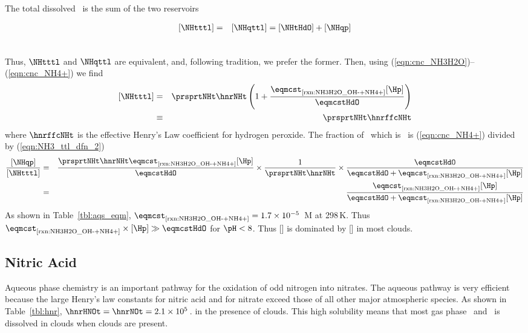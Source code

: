 \documentclass[12pt,twoside]{book}
\begin{document}
The total dissolved \NHt\ is the sum of the two reservoirs    
\newline\parbox{6in}{ %
\begin{eqnarray*}
[\NHtttl] & = & [\NHqttl] = [\NHtHdO] + [\NHqp]
\end{eqnarray*}
}\hfill %
\parbox{1cm}{\begin{eqnarray}\label{eqn:NH3_ttl_dfn}\end{eqnarray}}\newline
Thus, $\NHtttl$ and $\NHqttl$ are equivalent, and, following
tradition, we prefer the former.
Then, using (\ref{eqn:cnc_NH3H2O})--(\ref{eqn:cnc_NH4+}) we find
\begin{eqnarray}
\label{eqn:NH3_ttl_dfn_2}
[\NHtttl] & = & \prsprtNHt \hnrNHt \left(
1 + \frac{\eqmcst_{\mbox{\scriptsize \ref{rxn:NH3H2O_OH-+NH4+}}} [\Hp]}{\eqmcstHdO }
\right)
\\ %
\label{eqn:hnr_ffc_NH3_dfn}
& \equiv & \prsprtNHt \hnrffcNHt
\end{eqnarray}
where $\hnrffcNHt$ is the effective Henry's Law coefficient for
hydrogen peroxide.
The fraction of \NHtttl\ which is \NHqp\ is (\ref{eqn:cnc_NH4+}) divided
by (\ref{eqn:NH3_ttl_dfn_2})
\begin{eqnarray}
\frac{[\NHqp]}{[\NHtttl] } & = & 
\frac{\prsprtNHt \hnrNHt \eqmcst_{\mbox{\scriptsize \ref{rxn:NH3H2O_OH-+NH4+}}} [\Hp] }{
\eqmcstHdO } 
\times
\frac{1}{\prsprtNHt \hnrNHt } \times
\frac{\eqmcstHdO}{\eqmcstHdO + \eqmcst_{\mbox{\scriptsize \ref{rxn:NH3H2O_OH-+NH4+}}} [\Hp] }
\nonumber \\
& = & 
\frac{\eqmcst_{\mbox{\scriptsize \ref{rxn:NH3H2O_OH-+NH4+}}} [\Hp] }{
\eqmcstHdO + \eqmcst_{\mbox{\scriptsize \ref{rxn:NH3H2O_OH-+NH4+}}} [\Hp] }
\end{eqnarray}
As shown in Table~\ref{tbl:aqs_eqm}, 
$\eqmcst_{\mbox{\scriptsize \ref{rxn:NH3H2O_OH-+NH4+}}} = 1.7 \times 10^{-5}$~M at 298\,K\@.
Thus $\eqmcst_{\mbox{\scriptsize \ref{rxn:NH3H2O_OH-+NH4+}}} \times [\Hp] \gg \eqmcstHdO$
for $\pH < 8$.
Thus [\NHtttl] is dominated by [\NHqp] in most clouds.

\subsection[Nitric Acid]{Nitric Acid \HNOt}\label{sxn:aqs_eqm_HNO3}
Aqueous phase chemistry is an important pathway for the oxidation of
odd nitrogen into nitrates.
The aqueous pathway is very efficient because the large Henry's law
constants for nitric acid and for nitrate exceed those of all other
major atmospheric species.
As shown in Table~\ref{tbl:hnr}, 
$\hnrHNOt = \hnrNOt = 2.1 \times 10^{5}$\,\Mxatm.
in the presence of clouds.
This high solubility means that most gas phase \HNOt\ and \NOt\ is
dissolved in clouds when clouds are present. 
\end{document}

